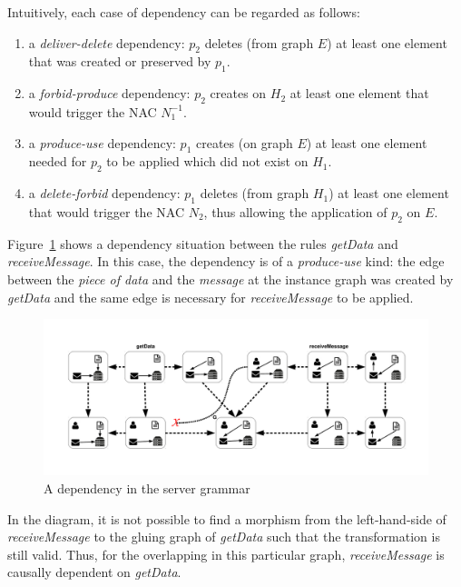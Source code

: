 Intuitively, each case of dependency can be regarded as follows:

\begin{enumerate}
  \item a \emph{deliver-delete} dependency: $p_2$ deletes (from graph $E$) at least one element that was created or preserved by $p_1$.
  \item a \emph{forbid-produce} dependency: $p_2$ creates on $H_2$ at least one element that would trigger the NAC $N_1^{-1}$.
  \item a \emph{produce-use} dependency: $p_1$ creates (on graph $E$) at least one element needed for $p_2$ to be applied which did not exist on $H_1$.
  \item a \emph{delete-forbid} dependency: $p_1$ deletes (from graph $H_1$) at least one element that would trigger the NAC $N_2$, thus allowing the application of $p_2$ on $E$.
\end{enumerate}

\begin{example}
  Figure~\ref{fig:gts:dependency} shows a dependency situation between the rules \emph{getData} and \emph{receiveMessage}. In this case, the dependency is of a \emph{produce-use} kind: the edge between the \emph{piece of data} and the \emph{message} at the instance graph was created by \emph{getData} and the same edge is necessary for \emph{receiveMessage} to be applied.

\begin{figure}[!ht]
  \centering
  \includegraphics[scale=0.5]{images/gts/dependency}
  \caption{A dependency in the server grammar}\label{fig:gts:dependency}
\end{figure}

  In the diagram, it is not possible to find a morphism from the left-hand-side of \emph{receiveMessage} to the gluing graph of \emph{getData} such that the transformation is still valid. Thus, for the overlapping in this particular graph, \emph{receiveMessage} is causally dependent on \emph{getData}.
\end{example}

